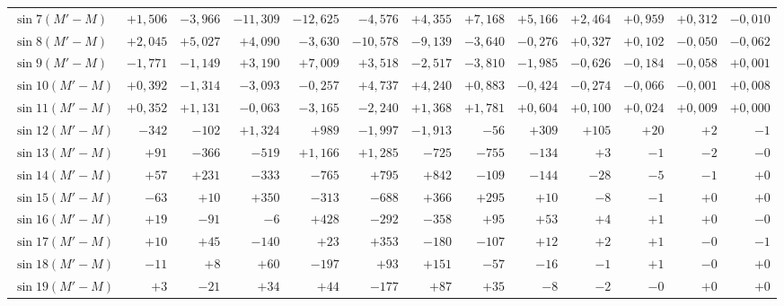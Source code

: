 \begin{landscape}
\begin{longtable}{@{}l|r|r|r|r|r|r|r|r|r|r|r|r@{}}
\(\sin 7(M'-M)\) & \(+1{,}506\) & \(-3{,}966\) & \(-11{,}309\) & \(-12{,}625\) & \(-4{,}576\) & \(+4{,}355\) & \(+7{,}168\) & \(+5{,}166\) & \(+2{,}464\) & \(+0{,}959\) & \(+0{,}312\) & \(-0{,}010\)\\
\(\sin 8(M'-M)\) & \(+2{,}045\) & \(+5{,}027\) & \(+4{,}090\) & \(-3{,}630\) & \(-10{,}578\) & \(-9{,}139\) & \(-3{,}640\) & \(-0{,}276\) & \(+0{,}327\) & \(+0{,}102\) & \(-0{,}050\) & \(-0{,}062\)\\
\(\sin 9(M'-M)\) & \(-1{,}771\) & \(-1{,}149\) & \(+3{,}190\) & \(+7{,}009\) & \(+3{,}518\) & \(-2{,}517\) & \(-3{,}810\) & \(-1{,}985\) & \(-0{,}626\) & \(-0{,}184\) & \(-0{,}058\) & \(+0{,}001\)\\
\(\sin 10(M'-M)\) & \(+0{,}392\) & \(-1{,}314\) & \(-3{,}093\) & \(-0{,}257\) & \(+4{,}737\) & \(+4{,}240\) & \(+0{,}883\) & \(-0{,}424\) & \(-0{,}274\) & \(-0{,}066\) & \(-0{,}001\) & \(+0{,}008\)\\
\(\sin 11(M'-M)\) & \(+0{,}352\) & \(+1{,}131\) & \(-0{,}063\) & \(-3{,}165\) & \(-2{,}240\) & \(+1{,}368\) & \(+1{,}781\) & \(+0{,}604\) & \(+0{,}100\) & \(+0{,}024\) & \(+0{,}009\) & \(+0{,}000\)\\
\(\sin 12(M'-M)\) & \(-342\) & \(-102\) & \(+1{,}324\) & \(+989\) & \(-1{,}997\) & \(-1{,}913\) & \(-56\) & \(+309\) & \(+105\) & \(+20\) & \(+2\) & \(-1\)\\
\(\sin 13(M'-M)\) & \(+91\) & \(-366\) & \(-519\) & \(+1{,}166\) & \(+1{,}285\) & \(-725\) & \(-755\) & \(-134\) & \(+3\) & \(-1\) & \(-2\) & \(-0\)\\
\(\sin 14(M'-M)\) & \(+57\) & \(+231\) & \(-333\) & \(-765\) & \(+795\) & \(+842\) & \(-109\) & \(-144\) & \(-28\) & \(-5\) & \(-1\) & \(+0\)\\
\(\sin 15(M'-M)\) & \(-63\) & \(+10\) & \(+350\) & \(-313\) & \(-688\) & \(+366\) & \(+295\) & \(+10\) & \(-8\) & \(-1\) & \(+0\) & \(+0\)\\
\(\sin 16(M'-M)\) & \(+19\) & \(-91\) & \(-6\) & \(+428\) & \(-292\) & \(-358\) & \(+95\) & \(+53\) & \(+4\) & \(+1\) & \(+0\) & \(-0\)\\
\(\sin 17(M'-M)\) & \(+10\) & \(+45\) & \(-140\) & \(+23\) & \(+353\) & \(-180\) & \(-107\) & \(+12\) & \(+2\) & \(+1\) & \(-0\) & \(-1\)\\
\(\sin 18(M'-M)\) & \(-11\) & \(+8\) & \(+60\) & \(-197\) & \(+93\) & \(+151\) & \(-57\) & \(-16\) & \(-1\) & \(+1\) & \(-0\) & \(+0\)\\
\(\sin 19(M'-M)\) & \(+3\) & \(-21\) & \(+34\) & \(+44\) & \(-177\) & \(+87\) & \(+35\) & \(-8\) & \(-2\) & \(-0\) & \(+0\) & \(+0\)\\

\end{longtable}
\end{landscape}
